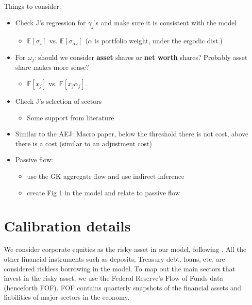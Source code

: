 \documentclass[12pt,english]{article}
\begin{document}
Things to consider:
\begin{itemize}
    \item Check J's regression for $\gamma_j$'s and make sure it is consistent with the model
    \begin{itemize}
        \item $\mathbb{E}[\sigma_x]$ vs. $\mathbb{E}[\sigma_{\alpha x}]$ ($\alpha$ is portfolio weight, under the ergodic dist.)
    \end{itemize}
    \item For $\omega_j$: should we consider \textbf{asset} shares or \textbf{net worth} shares? Probably asset share makes more sense?
\begin{itemize}
    \item $\mathbb{E}[x_j]$ vs. $\mathbb{E}[x_j \alpha_j]$.
\end{itemize}
    \item Check J's selection of sectors
    \begin{itemize}
        \item Some support from literature
    \end{itemize}
    \item Similar to the AEJ: Macro paper, below the threshold there is not cost, above there is a cost (similar to an adjustment cost)
    \item Passive flow:
    \begin{itemize}
        \item use the GK aggregate flow and use indirect inference
        \item create Fig 1 in the model and relate to passive flow
    \end{itemize}
\end{itemize}

\section{Calibration details}
\label{sec:calibration}

We consider corporate equities as the risky asset in our model, following \citep{he2013intermediary,Kargar/2021}. 
All the other financial instruments such as deposits, Treasury debt, loans, etc, are considered riskless borrowing in the model. To map out the main sectors that invest in the risky asset, we use the Federal Reserve's Flow of Funds data (henceforth FOF). FOF contains quarterly snapshots of the financial assets and liabilities of major sectors in the economy. 
\end{document}
